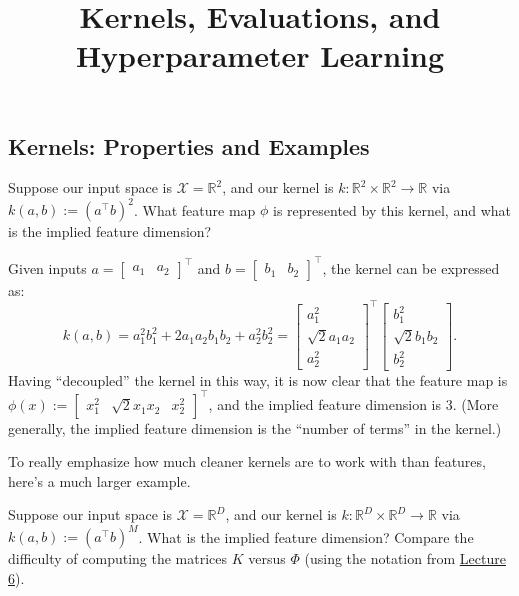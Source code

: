 \title{Kernels, Evaluations, and Hyperparameter Learning}



\subsection{Kernels: Properties and Examples}

\begin{problem}
    Suppose our input space is $\mathcal{X} = \mathbb{R}^2$,
    and our kernel is $k: \mathbb{R}^2 \times \mathbb{R}^2 \to \mathbb{R}$
    via $k(a, b) := (a^{\top}b)^2$.
    What feature map $\phi$ is represented by this kernel,
    and what is the implied feature dimension?
\end{problem}

\begin{solution}
    Given inputs $a = \begin{bmatrix} a_1 & a_2 \end{bmatrix}^{\top}$
    and $b = \begin{bmatrix} b_1 & b_2 \end{bmatrix}^{\top}$,
    the kernel can be expressed as:
    \[ k(a, b) = a_1^2b_1^2 + 2a_1a_2b_1b_2 + a_2^2b_2^2
    = \begin{bmatrix}
    a_1^2 \\ \sqrt{2} a_1a_2 \\ a_2^2
    \end{bmatrix}^{\top}
    \begin{bmatrix}
    b_1^2 \\ \sqrt{2} b_1b_2 \\ b_2^2
    \end{bmatrix}. \]
    Having ``decoupled'' the kernel in this way,
    it is now clear that the feature map is
    $\phi(x) := \begin{bmatrix}
        x_1^2 & \sqrt{2}x_1x_2 & x_2^2
    \end{bmatrix}^{\top}$,
    and the implied feature dimension is $3$.
    (More generally, the implied feature dimension
    is the ``number of terms'' in the kernel.)
\end{solution}

To really emphasize how much cleaner kernels are to work with
than features, here's a much larger example.

\begin{problem}
    Suppose our input space is $\mathcal{X} = \mathbb{R}^D$,
    and our kernel is $k: \mathbb{R}^D \times \mathbb{R}^D \to \mathbb{R}$
    via $k(a, b) := (a^{\top}b)^M$.
    What is the implied feature dimension?
    Compare the difficulty of computing the matrices $K$ versus $\Phi$
    (using the notation from \href{/6.790/lectures/6}{Lecture 6}).
\end{problem}

